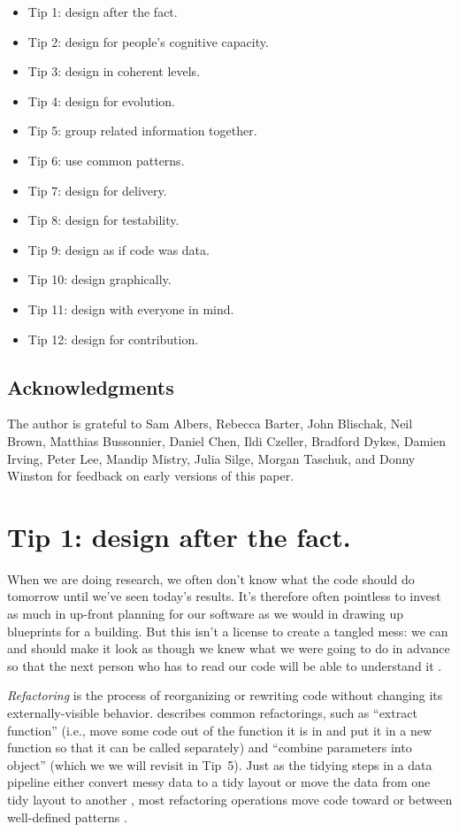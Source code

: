 \documentclass[10pt,letterpaper]{article}
\begin{document}
\begin{itemize}
  \itemsep0em
  \item Tip 1: design after the fact.
  \item Tip 2: design for people's cognitive capacity.
  \item Tip 3: design in coherent levels.
  \item Tip 4: design for evolution.
  \item Tip 5: group related information together.
  \item Tip 6: use common patterns.
  \item Tip 7: design for delivery.
  \item Tip 8: design for testability.
  \item Tip 9: design as if code was data.
  \item Tip 10: design graphically.
  \item Tip 11: design with everyone in mind.
  \item Tip 12: design for contribution.
\end{itemize}

\subsection*{Acknowledgments}

The author is grateful to Sam Albers,
Rebecca Barter,
John Blischak,
Neil Brown,
Matthias Bussonnier,
Daniel Chen,
Ildi Czeller,
Bradford Dykes,
Damien Irving,
Peter Lee,
Mandip Mistry,
Julia Silge,
Morgan Taschuk,
and Donny Winston
for feedback on early versions of this paper.

\section*{Tip 1: design after the fact.}

When we are doing research,
we often don't know what the code should do tomorrow
until we've seen today's results.
It's therefore often pointless to invest as much in up-front planning for our software
as we would in drawing up blueprints for a building.
But this isn't a license to create a tangled mess:
we can and should make it look as though we knew what we were going to do in advance
so that the next person who has to read our code will be able to understand it \cite{Parnas1986}.

\emph{Refactoring} is the process of reorganizing or rewriting code
without changing its externally-visible behavior.
\cite{Fowler2018} describes common refactorings,
such as ``extract function''
(i.e., move some code out of the function it is in
and put it in a new function so that it can be called separately)
and ``combine parameters into object''
(which we we will revisit in Tip~5).
Just as the tidying steps in a data pipeline
either convert messy data to a tidy layout or move the data from one tidy layout to another \cite{Wickham2017},
most refactoring operations move code toward or between well-defined patterns \cite{Kerievsky2004}.
\end{document}
